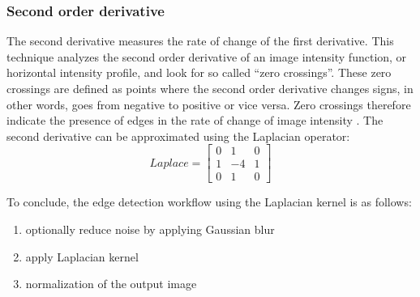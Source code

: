 \subsubsection*{Second order derivative}
The second derivative measures the rate of change of the first derivative.
This technique analyzes the second order derivative of an image intensity function, or horizontal intensity profile,
and look for so called ``zero crossings''.
These zero crossings are defined as points where the second order derivative changes signs,
in other words, goes from negative to positive or vice versa.
Zero crossings therefore indicate the presence of edges in the rate of change of image intensity \cite{gonzalezDigitalImageProcessing2007}.
The second derivative can be approximated using the Laplacian operator:
\begin{equation}
	Laplace =
	\begin{bmatrix}
		0 & 1  & 0 \\
		1 & -4 & 1 \\
		0 & 1  & 0
	\end{bmatrix}
\end{equation}

\noindent
To conclude, the edge detection workflow using the Laplacian kernel is as follows:
\begin{enumerate}
	\item optionally reduce noise by applying Gaussian blur
	\item apply Laplacian kernel
	\item normalization of the output image
\end{enumerate}

